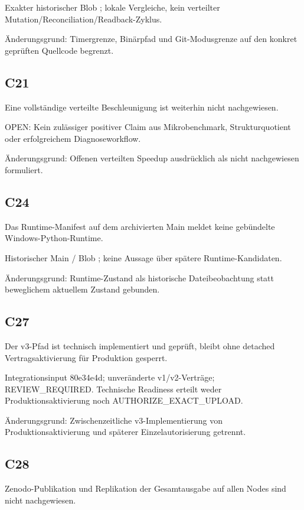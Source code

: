 Exakter historischer Blob ; lokale Vergleiche, kein verteilter Mutation/Reconciliation/Readback-Zyklus.

Änderungsgrund: Timergrenze, Binärpfad und Git-Modusgrenze auf den konkret geprüften Quellcode begrenzt.

\subsection{C21}
Eine vollständige verteilte Beschleunigung ist weiterhin nicht nachgewiesen.

OPEN: Kein zulässiger positiver Claim aus Mikrobenchmark, Strukturquotient oder erfolgreichem Diagnoseworkflow.

Änderungsgrund: Offenen verteilten Speedup ausdrücklich als nicht nachgewiesen formuliert.

\subsection{C24}
Das Runtime-Manifest auf dem archivierten Main meldet keine gebündelte Windows-Python-Runtime.

Historischer Main  / Blob ; keine Aussage über spätere Runtime-Kandidaten.

Änderungsgrund: Runtime-Zustand als historische Dateibeobachtung statt beweglichem aktuellem Zustand gebunden.

\subsection{C27}
Der v3-Pfad ist technisch implementiert und geprüft, bleibt ohne detached Vertragsaktivierung für Produktion gesperrt.

Integrationsinput 80e34e4d; unveränderte v1/v2-Verträge; REVIEW\_REQUIRED. Technische Readiness erteilt weder Produktionsaktivierung noch AUTHORIZE\_EXACT\_UPLOAD.

Änderungsgrund: Zwischenzeitliche v3-Implementierung von Produktionsaktivierung und späterer Einzelautorisierung getrennt.

\subsection{C28}
Zenodo-Publikation und Replikation der Gesamtausgabe auf allen Nodes sind nicht nachgewiesen.

